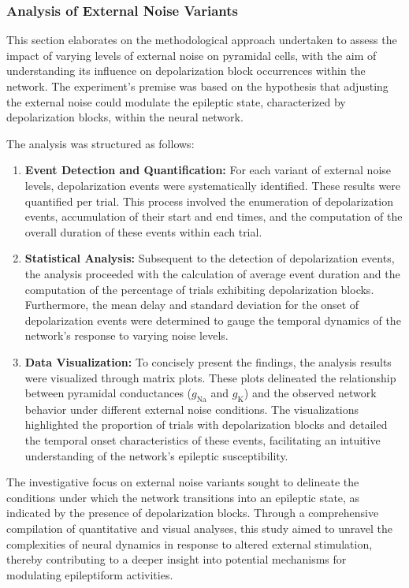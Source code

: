 \subsubsection{Analysis of External Noise Variants}
This section elaborates on the methodological approach undertaken to assess the
impact of varying levels of external noise on pyramidal cells, with the aim of
understanding its influence on depolarization block occurrences within the
network. The experiment's premise was based on the hypothesis that adjusting
the external noise could modulate the epileptic state, characterized by
depolarization blocks, within the neural network.


\noindent The analysis was structured as follows:
\begin{enumerate}
    \item \textbf{Event Detection and Quantification:} For each variant of external noise levels, depolarization events were systematically identified. These results were quantified per trial. This process involved the enumeration of depolarization events, accumulation of their start and end times, and the computation of the overall duration of these events within each trial.

    \item \textbf{Statistical Analysis:} Subsequent to the detection of depolarization events, the analysis proceeded with the calculation of average event duration and the computation of the percentage of trials exhibiting depolarization blocks. Furthermore, the mean delay and standard deviation for the onset of depolarization events were determined to gauge the temporal dynamics of the network's response to varying noise levels.

    \item \textbf{Data Visualization:} To concisely present the findings, the analysis results were visualized through matrix plots. These plots delineated the relationship between pyramidal conductances (\(g_{\text{Na}}\) and \(g_{\text{K}}\)) and the observed network behavior under different external noise conditions. The visualizations highlighted the proportion of trials with depolarization blocks and detailed the temporal onset characteristics of these events, facilitating an intuitive understanding of the network's epileptic susceptibility.
\end{enumerate}

\noindent The investigative focus on external noise variants sought to delineate the conditions under which the network transitions into an epileptic state, as indicated by the presence of depolarization blocks. Through a comprehensive compilation of quantitative and visual analyses, this study aimed to unravel the complexities of neural dynamics in response to altered external stimulation, thereby contributing to a deeper insight into potential mechanisms for modulating epileptiform activities.
\pagebreak

